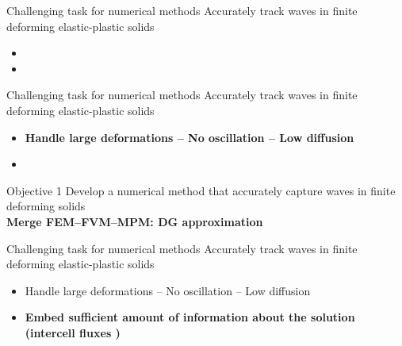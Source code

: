 \begin{withoutheadline}
  \begin{frame}{\text{  }}
    \vspace{-0.4cm}
    \begin{overprint}
      \begin{block}{Challenging task for numerical methods}
        \alert{Accurately track waves in finite deforming elastic-plastic solids}
        \begin{itemize}
          \item[]
        \item[]
        \end{itemize}
      \end{block}
      \begin{block}{Challenging task for numerical methods}
        \alert{Accurately track waves in finite deforming elastic-plastic solids}
        \begin{itemize}
        \item[1-] \textbf{Handle large deformations -- No oscillation -- Low diffusion}
          \item[]
        \end{itemize}
      \end{block}
      \begin{block}{Objective 1}
        Develop a numerical method that accurately capture waves in finite deforming solids \\
        \textbf{Merge FEM--FVM--MPM: DG approximation}
      \end{block}
      \begin{block}{Challenging task for numerical methods}
        \alert{Accurately track waves in finite deforming elastic-plastic solids}
        \begin{itemize}
        \item[1-] Handle large deformations -- No oscillation -- Low diffusion
        \item[2-] \textbf{Embed sufficient amount of information about the solution (intercell fluxes \cite{Thomas_EP})}

\end{itemize}
\end{block}
\end{overprint}
\end{frame}
\end{withoutheadline}
